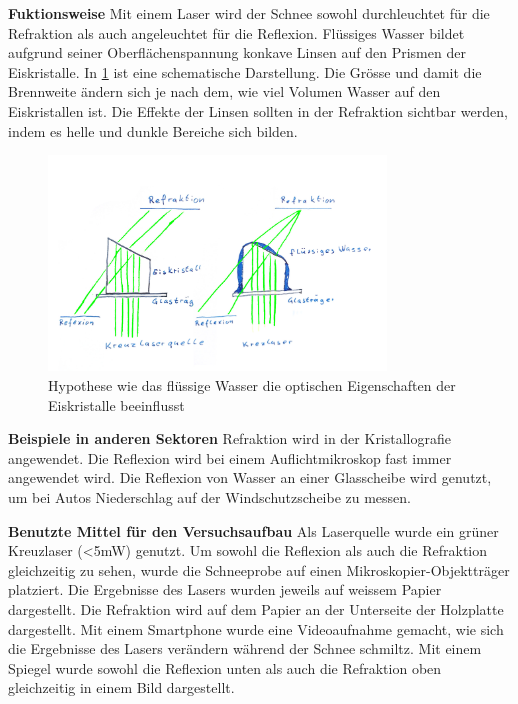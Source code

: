 

\textbf{Fuktionsweise} Mit einem Laser wird der Schnee sowohl durchleuchtet für die Refraktion als auch angeleuchtet für die Reflexion. Flüssiges Wasser bildet aufgrund seiner Oberflächenspannung konkave Linsen auf den Prismen der Eiskristalle. In \ref{fig:LaserHypothese} ist eine schematische Darstellung. Die Grösse und damit die Brennweite ändern sich je nach dem, wie viel Volumen Wasser auf den Eiskristallen ist. Die Effekte der Linsen sollten in der Refraktion sichtbar werden, indem es helle und dunkle Bereiche sich bilden.


\begin{figure}
    \centering
    \includegraphics[width=0.8\textwidth]{Bilder/Reflaktion.jpeg}
    \caption{Hypothese wie das flüssige Wasser die optischen Eigenschaften der Eiskristalle beeinflusst}
    \label{fig:LaserHypothese}
\end{figure}

\textbf{Beispiele in anderen Sektoren}
Refraktion wird in der Kristallografie angewendet. Die Reflexion wird bei einem Auflichtmikroskop fast immer angewendet wird. Die Reflexion von Wasser an einer Glasscheibe wird genutzt, um bei Autos Niederschlag auf der Windschutzscheibe zu messen.


\textbf{Benutzte Mittel für den Versuchsaufbau}
Als Laserquelle wurde ein grüner Kreuzlaser (<5mW) genutzt. Um sowohl die Reflexion als auch die Refraktion gleichzeitig zu sehen, wurde die Schneeprobe auf einen Mikroskopier-Objektträger platziert. Die Ergebnisse des Lasers wurden jeweils auf weissem Papier dargestellt. Die Refraktion wird auf dem Papier an der Unterseite der Holzplatte dargestellt. Mit einem Smartphone wurde eine Videoaufnahme gemacht, wie sich die Ergebnisse des Lasers verändern während der Schnee schmiltz. Mit einem Spiegel wurde sowohl die Reflexion unten als auch die Refraktion oben gleichzeitig in einem Bild dargestellt.



